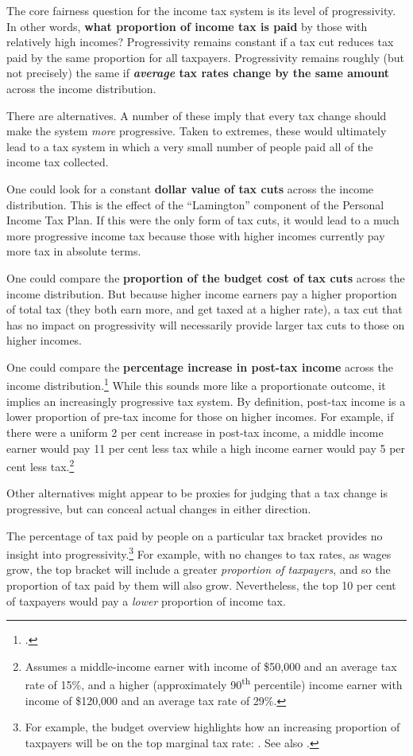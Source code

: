 \documentclass[submission]{grattan}\usepackage[]{graphicx}\usepackage[]{color}
\begin{document}
The core fairness question for the income tax system is its level of progressivity. In other words, \textbf{what proportion of income tax is paid} by those with relatively high incomes? Progressivity remains constant if a tax cut reduces tax paid by the same proportion for all taxpayers. Progressivity remains roughly (but not precisely) the same if \textbf{\emph{average} tax rates change by the same amount} across the income distribution.

There are alternatives. A number of these imply that every tax change should make the system \emph{more} progressive. Taken to extremes, these would ultimately lead to a tax system in which a very small number of people paid all of the income tax collected.

One could look for a constant \textbf{dollar value of tax cuts} across the income distribution. This is the effect of the ``Lamington'' component of the Personal Income Tax Plan. If this were the only form of tax cuts, it would lead to a much more progressive income tax because those with higher incomes currently pay more tax in absolute terms.

One could compare the \textbf{proportion of the budget cost of tax cuts} across the income distribution.
But because higher income earners pay a higher proportion of total tax (they both earn more, and get taxed at a higher rate), a tax cut that has no impact on progressivity will necessarily provide larger tax cuts to those on higher incomes.

One could compare the \textbf{percentage increase in post-tax income} across the income distribution.\footcite[][11]{Phillips2018}
While this sounds more like a proportionate outcome, it implies an increasingly progressive tax system. By definition, post-tax income is a lower proportion of pre-tax income for those on higher incomes. For example, if there were a uniform 2 per cent increase in post-tax income, a middle income earner would pay 11 per cent less tax while a high income earner would pay 5 per cent less tax.\footnote{Assumes a middle-income earner with income of \$50,000 and an average tax rate of 15\%, and a higher (approximately 90\textsuperscript{th} percentile) income earner with income of \$120,000 and an average tax rate of 29\%.}

Other alternatives might appear to be proxies for judging that a tax change is progressive, but can conceal actual changes in either direction.

The percentage of tax paid by people on a particular tax bracket provides no insight into progressivity.\footnote{For example, the budget overview highlights how an increasing proportion of taxpayers will be on the top marginal tax rate: \textcite[][9]{Treasury2018b}. See also \textcite[][7--8]{Treasury2018c}.}
For example, with no changes to tax rates, as wages grow, the top bracket will include a greater \emph{proportion of taxpayers}, and so the proportion of tax paid by them will also grow. Nevertheless, the top 10 per cent of taxpayers would pay a \emph{lower} proportion of income tax.
\end{document}
